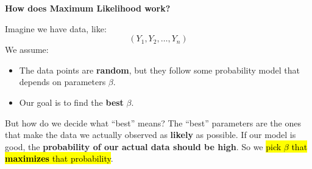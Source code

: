\highspace
\begin{flushleft}
    \textcolor{Green3}{ \textbf{How does Maximum Likelihood work?}}
\end{flushleft}
Imagine we have data, like:
\begin{equation*}
    \left(Y_1, Y_2, \dots, Y_n\right)
\end{equation*}
We assume:
\begin{itemize}
    \item The data points are \textbf{random}, but they follow some probability model that depends on parameters $\beta$.
    \item Our goal is to find the \textbf{best} $\beta$.
\end{itemize}
But how do we decide what ``best'' means? The ``best'' parameters are the ones that make the data we actually observed as \textbf{likely} as possible. If our model is good, the \textbf{probability of our actual data should be high}. So we \hl{pick $\beta$ that \textbf{maximizes} that probability}.
